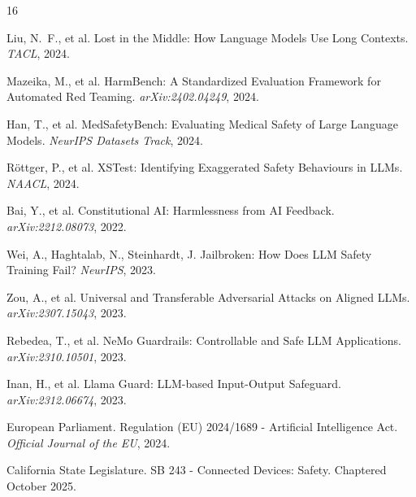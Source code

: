 \documentclass[11pt,twocolumn]{article}
\begin{document}

\begin{thebibliography}{16}

Liu, N.~F., et al.
\newblock Lost in the Middle: How Language Models Use Long Contexts.
\newblock \emph{TACL}, 2024.

Mazeika, M., et al.
\newblock HarmBench: A Standardized Evaluation Framework for Automated Red Teaming.
\newblock \emph{arXiv:2402.04249}, 2024.

Han, T., et al.
\newblock MedSafetyBench: Evaluating Medical Safety of Large Language Models.
\newblock \emph{NeurIPS Datasets Track}, 2024.

R{\"o}ttger, P., et al.
\newblock XSTest: Identifying Exaggerated Safety Behaviours in LLMs.
\newblock \emph{NAACL}, 2024.

Bai, Y., et al.
\newblock Constitutional AI: Harmlessness from AI Feedback.
\newblock \emph{arXiv:2212.08073}, 2022.

Wei, A., Haghtalab, N., Steinhardt, J.
\newblock Jailbroken: How Does LLM Safety Training Fail?
\newblock \emph{NeurIPS}, 2023.

Zou, A., et al.
\newblock Universal and Transferable Adversarial Attacks on Aligned LLMs.
\newblock \emph{arXiv:2307.15043}, 2023.

Rebedea, T., et al.
\newblock NeMo Guardrails: Controllable and Safe LLM Applications.
\newblock \emph{arXiv:2310.10501}, 2023.

Inan, H., et al.
\newblock Llama Guard: LLM-based Input-Output Safeguard.
\newblock \emph{arXiv:2312.06674}, 2023.

European Parliament.
\newblock Regulation (EU) 2024/1689 - Artificial Intelligence Act.
\newblock \emph{Official Journal of the EU}, 2024.

California State Legislature.
\newblock SB 243 - Connected Devices: Safety.
\newblock Chaptered October 2025.


\end{thebibliography}
\end{document}
